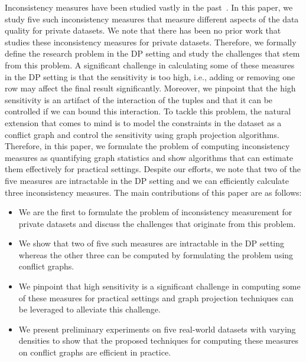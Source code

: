 {Inconsistency measures have been studied vastly in the past~\cite{hunter2008measuring, thimm2017compliance, LivshitsBKS20, LivshitsKTIKR21}. In this paper, we study five such inconsistency measures that measure different aspects of the data quality for private datasets. We note that there has been no prior work that studies these inconsistency measures for private datasets. Therefore, we formally define the research problem in the DP setting and study the challenges that stem from this problem. 
A significant challenge in calculating some of these measures in the DP setting is that the sensitivity is too high, i.e., adding or removing one row may affect the final result significantly. Moreover, we pinpoint that the high sensitivity is an artifact of the interaction of the tuples and that it can be controlled if we can bound this interaction. To tackle this problem, the natural extension that comes to mind is to model the constraints in the dataset as a conflict graph and control the sensitivity using graph projection algorithms. Therefore, in this paper, we formulate the problem of computing inconsistency measures as quantifying graph statistics and show algorithms that can estimate them effectively for practical settings. Despite our efforts, we note that two of the five measures are intractable in the DP setting and we can efficiently calculate three inconsistency measures. The main contributions of this paper are as follows: 
 
\begin{itemize}
    \item We are the first to formulate the problem of inconsistency measurement for private datasets and discuss the challenges that originate from this problem. 
    \item We show that two of five such measures are intractable in the DP setting whereas the other three can be computed by formulating the problem using conflict graphs.
    \item We pinpoint that high sensitivity is a significant challenge in computing some of these measures for practical settings and graph projection techniques can be leveraged to alleviate this challenge.
    \item We present preliminary experiments on five real-world datasets with varying densities to show that the proposed techniques for computing these measures on conflict graphs are efficient in practice.
\end{itemize}
}
